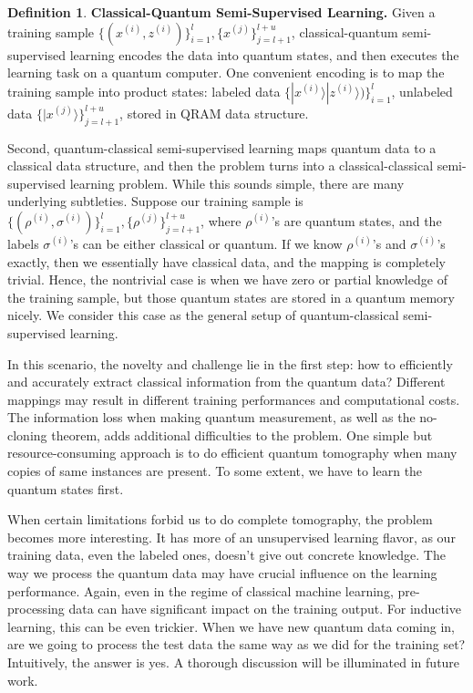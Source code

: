\documentclass[11pt]{article}
\theoremstyle{definition}
\newtheorem{definition}{Definition}[section]
\def\zsi{z^{(i)}}
\def\xsi{x^{(i)}}
\def\xsj{x^{(j)}}
\def\rsi{\rho^{(i)}}
\def\rsj{\rho^{(j)}}
\def\csi{\sigma^{(i)}}
\begin{document}
\begin{definition}
\textbf{Classical-Quantum Semi-Supervised Learning.}
Given a training sample $\{ (\xsi, \zsi) \}_{i = 1}^l, \{ \xsj \}_{j = l+1}^{l + u}$, classical-quantum semi-supervised learning encodes the data into quantum states, and then executes the learning task on a quantum computer. One convenient encoding is to map the training sample into product states: labeled data $\{ |\xsi\rangle |\zsi\rangle) \}_{i = 1}^l$, unlabeled data $\{ |\xsj\rangle \}_{j = l+1}^{l + u}$, stored in QRAM data structure. 
\end{definition}

Second, quantum-classical semi-supervised learning maps quantum data to a classical data structure, and then the problem turns into a classical-classical semi-supervised learning problem. While this sounds simple, there are many underlying subtleties. Suppose our training sample is $\{ (\rsi, \csi) \}_{i = 1}^l, \{ \rsj \}_{j = l+1}^{l + u}$, where $\rsi$'s are quantum states, and the labels $\csi$'s can be either classical or quantum. If we know $\rsi$'s and $\csi$'s exactly, then we essentially have classical data, and the mapping is completely trivial. Hence, the nontrivial case is when we have zero or partial knowledge of the training sample, but those quantum states are stored in a quantum memory nicely. We consider this case as the general setup of quantum-classical semi-supervised learning.

In this scenario, the novelty and challenge lie in the first step: how to efficiently and accurately extract classical information from the quantum data? Different mappings may result in different training performances and computational costs. The information loss when making quantum measurement, as well as the no-cloning theorem, adds additional difficulties to the problem. One simple but resource-consuming approach is to do efficient quantum tomography when many copies of same instances are present. To some extent, we have to learn the quantum states first. 

When certain limitations forbid us to do complete tomography, the problem becomes more interesting. It has more of an unsupervised learning flavor, as our training data, even the labeled ones, doesn't give out concrete knowledge. The way we process the quantum data may have crucial influence on the learning performance. Again, even in the regime of classical machine learning, pre-processing data can have significant impact on the training output. 
For inductive learning, this can be even trickier. When we have new quantum data coming in, are we going to process the test data the same way as we did for the training set? Intuitively, the answer is yes. A thorough discussion will be illuminated in future work.
\end{document}
